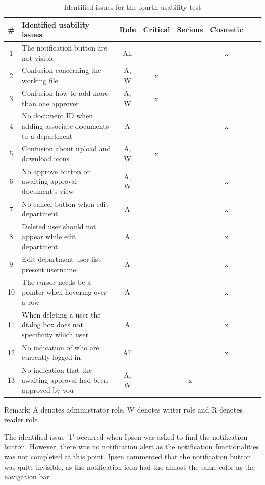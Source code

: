 \documentclass[../../master.tex]{subfiles}
\begin{document}
\begin{table}[H]
	\begin{center}
	\begin{tabular}{| c | m{15em} | c | c | c | c | c | c |}
		\hline
		\# & \textbf{Identified usability issues} & Role & Critical & Serious & Cosmetic \\
		\hline
		 1 & The notification button are not visible & All & & & x \\
		\hline
		 2 & Confusion concerning the working file & A, W & x & & \\
		\hline
		 3 & Confusion how to add more than one approver & A, W & x & & \\
		\hline
		4 & No document ID when adding associate documents to a department & A & & & x\\
		\hline
		5 &  Confusion about upload and download icons & A, W & x &  &\\
		\hline
		6 & No approve button on awaiting approval document's view & A, W &  & & x\\
		\hline
		7 & No cancel button when edit department & A & & & x\\
		\hline
		8 & Deleted user should not appear while edit department & A & & & x \\
		\hline
		9 & Edit department user list present username & A &  & & x \\
		\hline
		10 & The cursor needs be a pointer when hovering over a row & A &  &  & x \\
		\hline
		11 & When deleting a user the dialog box  does not specificity which user & A & & & x\\
		\hline
		12 & No indication of who are currently logged in & All & & & x \\
		\hline
		13 & No indication that the awaiting approval had been approved by you & A, W & & x & \\
		\hline
	\end{tabular}
	\end{center}
	 {\raggedright Remark: A denotes administrator role, W denotes writer role and R denotes reader role.\par}
	\caption{Identified issues for the fourth usability test}\label{tab:utest4}
\end{table}

The identified issue '1' occurred when Ipsen was asked to find the notification button.
However, there was no notification alert as the notification functionalities was not completed at this point.
Ipsen commented that the notification button was quite invisible, as the notification icon had the almost the same color as the navigation bar.
\end{document}
